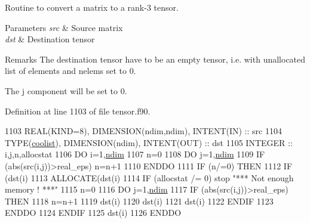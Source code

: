 Routine to convert a matrix to a rank-\/3 tensor. 


\begin{DoxyParams}{Parameters}
{\em src} & Source matrix \\
\hline
{\em dst} & Destination tensor \\
\hline
\end{DoxyParams}
\begin{DoxyRemark}{Remarks}
The destination tensor have to be an empty tensor, i.\+e. with unallocated list of elements and nelems set to 0. 

The j component will be set to 0. 
\end{DoxyRemark}


Definition at line 1103 of file tensor.\+f90.


\begin{DoxyCode}
1103    \textcolor{keywordtype}{REAL(KIND=8)}, \textcolor{keywordtype}{DIMENSION(ndim,ndim)}, \textcolor{keywordtype}{INTENT(IN)} :: src
1104    \textcolor{keywordtype}{TYPE}(\hyperlink{structtensor_1_1coolist}{coolist}), \textcolor{keywordtype}{DIMENSION(ndim)}, \textcolor{keywordtype}{INTENT(OUT)} :: dst
1105    \textcolor{keywordtype}{INTEGER} :: i,j,n,allocstat
1106    \textcolor{keywordflow}{DO} i=1,\hyperlink{namespaceparams_a2323fe1773f086e20c14f266351c482b}{ndim}
1107       n=0
1108       \textcolor{keywordflow}{DO} j=1,\hyperlink{namespaceparams_a2323fe1773f086e20c14f266351c482b}{ndim}
1109          \textcolor{keywordflow}{IF} (abs(src(i,j))>real\_eps) n=n+1
1110 \textcolor{keywordflow}{      ENDDO}
1111       \textcolor{keywordflow}{IF} (n/=0) \textcolor{keywordflow}{THEN}
1112          \textcolor{keywordflow}{IF} (dst(i)%
1113          \textcolor{keyword}{ALLOCATE}(dst(i)%
1114          \textcolor{keywordflow}{IF} (allocstat /= 0) stop \textcolor{stringliteral}{"*** Not enough memory ! ***"}
1115          n=0
1116          \textcolor{keywordflow}{DO} j=1,\hyperlink{namespaceparams_a2323fe1773f086e20c14f266351c482b}{ndim}
1117             \textcolor{keywordflow}{IF} (abs(src(i,j))>real\_eps) \textcolor{keywordflow}{THEN}
1118                n=n+1
1119                dst(i)%
1120                dst(i)%
1121                dst(i)%
1122 \textcolor{keywordflow}{            ENDIF}
1123 \textcolor{keywordflow}{         ENDDO}
1124 \textcolor{keywordflow}{      ENDIF}
1125       dst(i)%
1126 \textcolor{keywordflow}{   ENDDO}
\end{DoxyCode}
